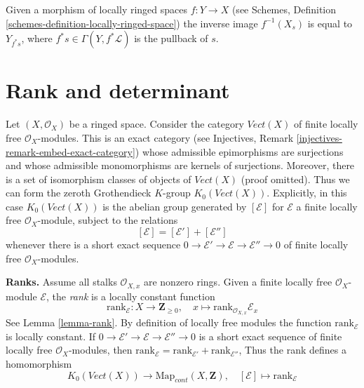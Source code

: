 \begin{remark}
\label{remark-pullback-s-open}
Given a morphism of locally ringed spaces $f : Y \to X$
(see Schemes, Definition \ref{schemes-definition-locally-ringed-space})
the inverse image $f^{-1}(X_s)$ is equal to $Y_{f^*s}$, where
$f^*s \in \Gamma(Y, f^*\mathcal{L})$ is the pullback of $s$.
\end{remark}


\section{Rank and determinant}
\label{section-rank-and-det}

\noindent
Let $(X, \mathcal{O}_X)$ be a ringed space. Consider the category
$\textit{Vect}(X)$ of finite locally free $\mathcal{O}_X$-modules.
This is an exact category
(see Injectives, Remark \ref{injectives-remark-embed-exact-category})
whose admissible epimorphisms are
surjections and whose admissible monomorphisms are kernels of
surjections. Moreover, there is a set of isomorphism classes
of objects of $\textit{Vect}(X)$ (proof omitted). Thus we can form
the zeroth Grothendieck $K$-group $K_0(\textit{Vect}(X))$.
Explicitly, in this case $K_0(\textit{Vect}(X))$
is the abelian group generated by $[\mathcal{E}]$ for $\mathcal{E}$
a finite locally free $\mathcal{O}_X$-module, subject to the relations
$$
[\mathcal{E}] = [\mathcal{E}'] + [\mathcal{E}'']
$$
whenever there is a short exact sequence
$0 \to \mathcal{E}' \to \mathcal{E} \to \mathcal{E}'' \to 0$
of finite locally free $\mathcal{O}_X$-modules.

\medskip\noindent
{\bf Ranks.} Assume all stalks $\mathcal{O}_{X, x}$ are nonzero rings.
Given a finite locally free $\mathcal{O}_X$-module $\mathcal{E}$,
the {\it rank} is a locally constant function
$$
\text{rank}_\mathcal{E} : X \longrightarrow \mathbf{Z}_{\geq 0},\quad
x \longmapsto \text{rank}_{\mathcal{O}_{X, x}} \mathcal{E}_x
$$
See Lemma \ref{lemma-rank}. By definition of locally free
modules the function $\text{rank}_\mathcal{E}$ is locally constant. If 
$0 \to \mathcal{E}' \to \mathcal{E} \to \mathcal{E}'' \to 0$
is a short exact sequence of finite locally free $\mathcal{O}_X$-modules,
then $\text{rank}_\mathcal{E} = \text{rank}_{\mathcal{E}'} +
\text{rank}_{\mathcal{E}''}$,
Thus the rank defines a homomorphism
$$
K_0(\textit{Vect}(X)) \longrightarrow \text{Map}_{cont}(X, \mathbf{Z}),\quad
[\mathcal{E}] \longmapsto \text{rank}_\mathcal{E}
$$

